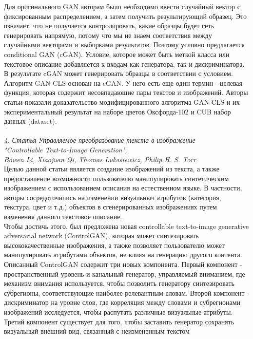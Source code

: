 \documentclass{article}
\begin{document}
    Для оригинального GAN авторам было необходимо ввести случайный вектор с фиксированным распределением, а затем получить результирующий образец. Это означает, что не получается контролировать, какие образцы будет сеть генерировать напрямую, потому что мы не знаем соответствия между случайными векторами и выборками результатов. Поэтому условно предлагается conditional GAN (cGAN). Условие, которое может быть меткой класса или текстовое описание добавляется к входам как генератора, так и дискриминатора. В результате cGAN может генерировать образцы в соответствии с условием. 
    \\
    Алгоритм GAN-CLS основан на cGAN. У него есть еще один термин - целевая функция, которая содержит несовпадающие пары текстов и изображений. Авторы статьи показали доказательство модифицированного алгоритма GAN-CLS и их экспериментальный результат на наборе цветов Оксфорда-102 и CUB набор данных (dataset).
    \\ \\
    \textit{4. Статья Управляемое преобразование текста в изображение
    \\
    "Controllable Text-to-Image Generation",
    \\
    Bowen Li, Xiaojuan Qi, Thomas Lukasiewicz, Philip H. S. Torr}
    \\

    Целью данной статьи является создание изображений из текста, а также предоставление возможности пользователю манипулировать синтетическим изображением с использованием описания на естественном языке. В частности, авторы сосредоточились на изменении визуальныч атрибутов (категория, текстура, цвет и т.д.) объектов в сгенерированных изображениях путем изменения данного текстовое описание. 
    \\
    Чтобы достичь этого, был предложена новая controllable text-to-image generative adversarial network (ControlGAN), которая может синтезировать высококачественные изображения, а также позволяет пользователю может манипулировать атрибутами объектов, не влияя на генерацию другого контента. 
    \\
    Описанный ControlGAN содержит три новых компонента. Первый компонент - пространственный уровень и канальный генератор, управляемый вниманием, где механизм внимания используется, чтобы позволить генератору синтезировать субрегионы, соответствующие наиболее релевантным словам. Второй компонент - дискриминатор на уровне слов, где корреляция между словами и субрегионами изображений исследуется, чтобы распутать различные визуальные атрибуты. Третий компонент существует для того, чтобы заставить генератор сохранять визуальный внешний вид, связанный с неизмененным текстом
    
\end{document}
